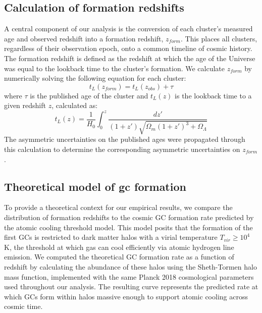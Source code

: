 \documentclass[]{article}
\begin{document}
\subsection{Calculation of formation redshifts}
A central component of our analysis is the conversion of each cluster's measured age and observed redshift into a formation redshift, $z_{form}$. This places all clusters, regardless of their observation epoch, onto a common timeline of cosmic history. The formation redshift is defined as the redshift at which the age of the Universe was equal to the lookback time to the cluster's formation. We calculate $z_{form}$ by numerically solving the following equation for each cluster:
\begin{equation}
    t_L(z_{form}) = t_L(z_{obs}) + \tau
\end{equation}
where $\tau$ is the published age of the cluster and $t_L(z)$ is the lookback time to a given redshift $z$, calculated as:
\begin{equation}
    t_L(z) = \frac{1}{H_0} \int_0^z \frac{dz'}{(1+z')\sqrt{\Omega_m(1+z')^3 + \Omega_\Lambda}}
\end{equation}
The asymmetric uncertainties on the published ages were propagated through this calculation to determine the corresponding asymmetric uncertainties on $z_{form}$.

\subsection{Theoretical model of gc formation}
To provide a theoretical context for our empirical results, we compare the distribution of formation redshifts to the cosmic GC formation rate predicted by the atomic cooling threshold model. This model posits that the formation of the first GCs is restricted to dark matter halos with a virial temperature $T_{vir} \geq 10^4$ K, the threshold at which gas can cool efficiently via atomic hydrogen line emission. We computed the theoretical GC formation rate as a function of redshift by calculating the abundance of these halos using the Sheth-Tormen halo mass function, implemented with the same Planck 2018 cosmological parameters used throughout our analysis. The resulting curve represents the predicted rate at which GCs form within halos massive enough to support atomic cooling across cosmic time.
\end{document}
